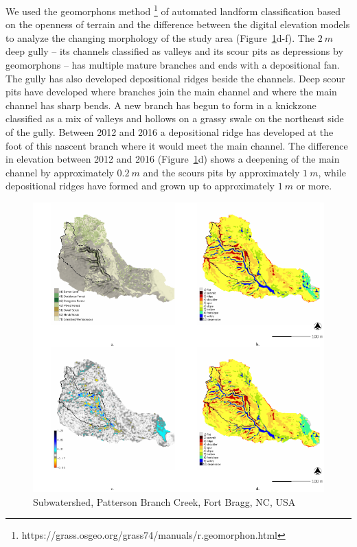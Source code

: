 \documentclass[esurf, manuscript]{copernicus}
\begin{document}
We used the geomorphons method 
\footnote{https://grass.osgeo.org/grass74/manuals/r.geomorphon.html}
of automated landform classification
based on the openness of terrain \citep{Jasiewicz2013}
and the difference between the digital elevation models 
to analyze the changing morphology of the study area
(Figure~\ref{fig:study_area}d-f). 
%
The $2~m$ deep gully -- 
its channels classified as valleys and 
its scour pits as depressions by geomorphons -- 
has multiple mature branches
and ends with a depositional fan.
%
The gully has also developed 
depositional ridges beside the channels.
Deep scour pits have developed 
where branches join the main channel 
and where the main channel has sharp bends.
%
A new branch has begun to form 
in a knickzone classified as a mix of valleys and hollows
on a grassy swale on the northeast side of the gully.
Between 2012 and 2016 a depositional ridge
has developed at the foot of this nascent branch
where it would meet the main channel. 
%
The difference in elevation between 2012 and 2016
(Figure~\ref{fig:study_area}d)
shows a deepening of the main channel 
by approximately $0.2~m$ 
and the scours pits
by approximately $1~m$,
while depositional ridges have formed and grown up to
approximately $1~m$ or more.

\begin{figure}%
\center
\includegraphics[width=\textwidth,height=0.95\textheight,keepaspectratio]{figures/study_area.pdf}
\caption{Subwatershed, Patterson Branch Creek, Fort Bragg, NC, USA}
\label{fig:study_area}
\end{figure}
\end{document}
